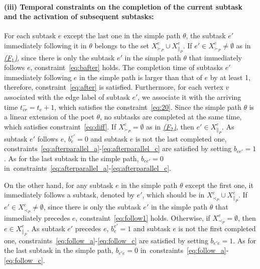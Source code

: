 \documentclass[Afour,sageh,times]{sagej}
\begin{document}
{{\paragraph{(iii) Temporal constraints on the completion of the
current subtask and the activation of subsequent
subtasks:}
For each subtask $e$ except the last one in the simple path $\theta$, the subtask $e'$ immediately following it in $\theta$ belongs to the set $X_{\succ_P}^e \cup X_{\|_P}^e$. If $e' \in X_{\succ_P}^e \neq \emptyset$ as in \hyperref[activation:a]{\it (F$_1$)}, since there is only the subtask $e'$ in the simple path $\theta$ that immediately follows $e$, constraint~\eqref{eq:bafter} holds. The completion time  of subtasks $e'$ immediately following  $e$ in the simple path is larger than that of $e$ by at least 1, therefore, constraint~\eqref{eq:after} is satisfied. %
Furthermore, for each vertex $v$ associated with the edge label of subtask $e'$, we associate it with the arriving time $t_{vr}^- = t_{e}+1$, which satisfies the constraint~\eqref{eq:20}. Since the simple path $\theta$ is a linear extension of the poet $\theta$, no subtasks are completed at the same time, which satisfies constraint~\eqref{eq:diff}. If $X_{\succ_P}^e = \emptyset$ as in \hyperref[activation:b]{\it (F$_2$)}, then $e' \in X_{\|_P}^e$. As subtask $e'$ follows $e$, $b_e^{e'}=0$ and  subtask $e$ is not the last completed one, constraints~\eqref{eq:afterparallel_a}-\eqref{eq:afterparallel_c} are satisfied by setting $b_{ee'}=1$.  As for the last subtask in the simple path, $b_{ee'}=0$  in~constraints~\eqref{eq:afterparallel_a}-\eqref{eq:afterparallel_c}.

On the other hand, for any subtask $e$ in the simple path $\theta$ except the first one, it immediately follows a subtask, denoted by $e'$, which should be in $X_{\prec_P}^e \cup X_{\|_P}^e$. If $e'\in  X_{\prec_P}^e \neq \emptyset$, since there is only the subtask $e'$ in the simple path $\theta$ that immediately precedes $e$, constraint~\eqref{eq:follow1} holds. Otherwise, if $X_{\prec_P}^e = \emptyset$, then $e \in X_{\|_P}^e$. As subtask $e'$ precedes $e$, $b_e^{e'}=1$ and subtask $e$ is not the first completed one, constraints~\eqref{eq:follow_a}-\eqref{eq:follow_c} are satisfied by setting $b_{e'e}=1$.  As for the last subtask in the simple path, $b_{e'e}=0$ in~constraints~\eqref{eq:follow_a}-\eqref{eq:follow_c}.

}}
\end{document}
